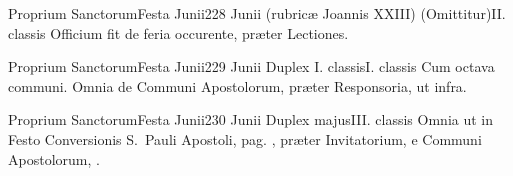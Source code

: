 \documentclass[nocturnale-romanum.tex]{subfiles}
\begin{document}
	{Proprium Sanctorum}{Festa Junii}{2}{28 Junii (rubricæ Joannis XXIII)}
	{(Omittitur)}{II. classis}
	{}
	{Officium fit de feria occurente, præter Lectiones.}

	{Proprium Sanctorum}{Festa Junii}{2}{29 Junii}
	{Duplex I. classis}{I. classis}
	{Cum octava communi. Omnia de Communi Apostolorum, præter Responsoria, ut infra.}
	{}
\tedeumrubric

	{Proprium Sanctorum}{Festa Junii}{2}{30 Junii}
	{Duplex majus}{III. classis}
	{Omnia ut in Festo Conversionis S.\ Pauli Apostoli, pag. \pageref{M-0125}, præter Invitatorium, e Communi Apostolorum, \pageref{M-APEX}.}
	{}
\end{document}
